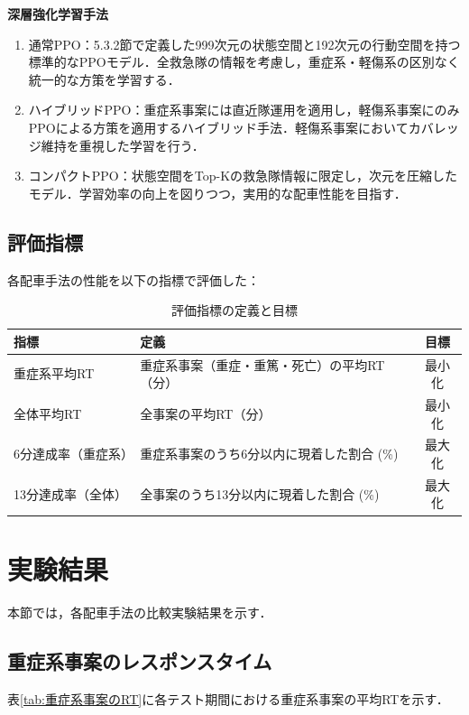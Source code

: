 \noindent\textbf{深層強化学習手法}
\begin{enumerate}[resume, label=\arabic*., leftmargin=*]
    \item 通常PPO：5.3.2節で定義した999次元の状態空間と192次元の行動空間を持つ標準的なPPOモデル．全救急隊の情報を考慮し，重症系・軽傷系の区別なく統一的な方策を学習する．
    \item ハイブリッドPPO：重症系事案には直近隊運用を適用し，軽傷系事案にのみPPOによる方策を適用するハイブリッド手法．軽傷系事案においてカバレッジ維持を重視した学習を行う．
    \item コンパクトPPO：状態空間をTop-Kの救急隊情報に限定し，次元を圧縮したモデル．学習効率の向上を図りつつ，実用的な配車性能を目指す．
\end{enumerate}

\subsection{評価指標}
各配車手法の性能を以下の指標で評価した：

\begin{table}[htbp]
    \centering
    \caption{評価指標の定義と目標}
    \label{tab:evaluation_metrics}
    \begin{tabular}{llc}
        \toprule
        指標 & 定義 & 目標 \\
        \midrule
        重症系平均RT & 重症系事案（重症・重篤・死亡）の平均RT（分） & 最小化 \\
        全体平均RT & 全事案の平均RT（分） & 最小化 \\
        6分達成率（重症系） & 重症系事案のうち6分以内に現着した割合 (\%) & 最大化 \\
        13分達成率（全体） & 全事案のうち13分以内に現着した割合 (\%) & 最大化 \\
        \bottomrule
    \end{tabular}
\end{table}
\clearpage
\section{実験結果}
本節では，各配車手法の比較実験結果を示す．

\subsection{重症系事案のレスポンスタイム}
表\ref{tab:重症系事案のRT}に各テスト期間における重症系事案の平均RTを示す．

